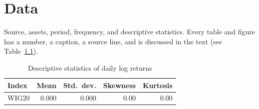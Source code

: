 \chapter{Data}

Source, assets, period, frequency, and descriptive statistics. Every table and figure has a number,
a caption, a source line, and is discussed in the text (see Table~\ref{tab:descriptive}).

\begin{table}[htbp]
  \centering
  \caption{Descriptive statistics of daily log returns}
  \label{tab:descriptive}
  \begin{tabular}{lrrrr}
    \toprule
    Index & Mean & Std.\ dev. & Skewness & Kurtosis \\
    \midrule
    WIG20 & 0.000 & 0.000 & 0.00 & 0.00 \\
    \bottomrule
  \end{tabular}
\end{table}
